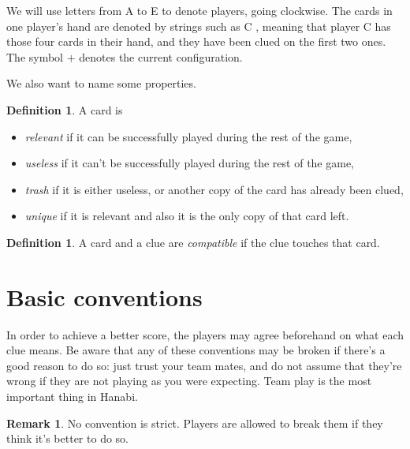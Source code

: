 \documentclass[a4paper]{article}
\theoremstyle{plain}
\theoremstyle{definition}
\newtheorem{definition}[theorem]{Definition}
\newtheorem{remark}[theorem]{Remark}
\begin{document}
We will use letters from A to E to denote players, going clockwise. The cards in one player's hand are denoted by strings such as C    , meaning that player C has those four cards in their hand, and they have been clued on the first two ones. The symbol $+$ denotes the current configuration.


We also want to name some properties.

\begin{definition}
	A card is
	
	\begin{itemize}
		\item \textit{relevant} if it can be successfully played during the rest of the game,
		\item \textit{useless} if it can't be successfully played during the rest of the game,
		\item \textit{trash} if it is either useless, or another copy of the card has already been clued,
		\item \textit{unique} if it is relevant and also it is the only copy of that card left.
	\end{itemize}

\end{definition}

\begin{definition}
	A card and a clue are \emph{compatible} if the clue touches that card.
\end{definition}

\section{Basic conventions}

In order to achieve a better score, the players may agree beforehand on what each clue means. Be aware that any of these conventions may be broken if there's a good reason to do so: just trust your team mates, and do not assume that they're wrong if they are not playing as you were expecting. Team play is the most important thing in Hanabi.

\begin{remark}
	No convention is strict. Players are allowed to break them if they think it's better to do so.
\end{remark}
\end{document}
